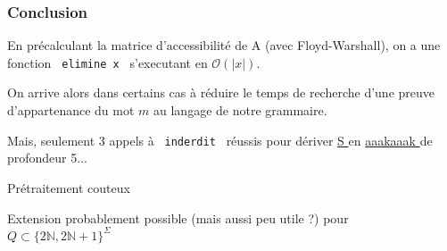\documentclass[12pt]{beamer}
\begin{document}
\begin{frame}\frametitle{Conclusion}
En précalculant la matrice d'accessibilité de A (avec Floyd-Warshall), on a une fonction \texttt{ elimine x } s'executant en $\mathcal{O} (|x|)$.

On arrive alors dans certains cas à réduire le temps de recherche d'une preuve d'appartenance du mot $m$ au langage de notre grammaire.

Mais, seulement 3 appels à \texttt{ inderdit } réussis pour dériver \underline{ S } en \underline{ aaakaaak } de profondeur 5...

Prétraitement couteux

Extension probablement possible (mais aussi peu utile ?) pour $Q \subset \{2 \mathbb{N} , 2 \mathbb{N} + 1 \}^\Sigma$
\end{frame}
\end{document}
